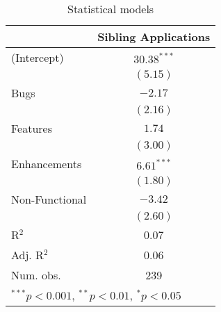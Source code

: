 
\begin{table}
\begin{center}
\begin{tabular}{l c }
\hline
               & Sibling Applications \\
\hline
(Intercept)    & $30.38^{***}$ \\
               & $(5.15)$      \\
Bugs           & $-2.17$       \\
               & $(2.16)$      \\
Features       & $1.74$        \\
               & $(3.00)$      \\
Enhancements   & $6.61^{***}$  \\
               & $(1.80)$      \\
Non-Functional & $-3.42$       \\
               & $(2.60)$      \\
\hline
R$^2$          & 0.07          \\
Adj. R$^2$     & 0.06          \\
Num. obs.      & 239           \\
\hline
\multicolumn{2}{l}{\scriptsize{$^{***}p<0.001$, $^{**}p<0.01$, $^*p<0.05$}}
\end{tabular}
\caption{Statistical models}
\label{tab:sibModel}
\end{center}
\end{table}
